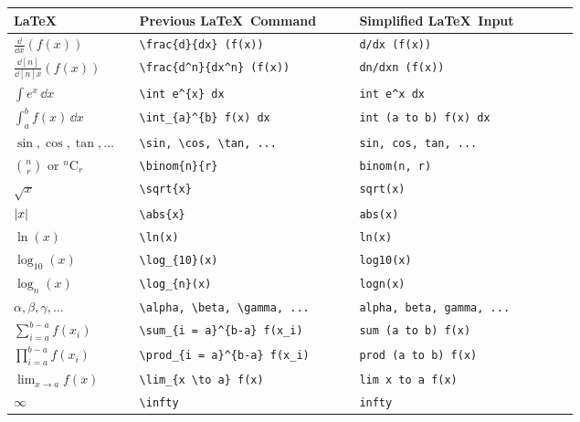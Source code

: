 \documentclass{article}
\begin{document}
\begin{longtable}[]{@{}
  >{\raggedright\arraybackslash}p{0.20\linewidth}
  >{\raggedright\arraybackslash}p{0.35\linewidth}
  >{\raggedright\arraybackslash}p{0.35\linewidth}@{}}
\toprule
\begin{minipage}[b]{\linewidth}\raggedright
\LaTeX
\end{minipage} & \begin{minipage}[b]{\linewidth}\raggedright
Previous \LaTeX \, Command
\end{minipage} & \begin{minipage}[b]{\linewidth}\raggedright
Simplified \LaTeX \, Input
\end{minipage} \\
\midrule
\endhead
\(\displaystyle\frac{\dd}{\dd x}(f(x))\) &
\texttt{\textbackslash{}frac\{d\}\{dx\}\ (f(x))} &
\texttt{d/dx\ (f(x))} \\
\(\displaystyle\frac{\dd[n]}{\dd[n]x}(f(x))\) &
\texttt{\textbackslash{}frac\{d\^{}n\}\{dx\^{}n\}\ (f(x))} &
\texttt{dn/dxn\ (f(x))} \\
\(\displaystyle\int e^{x} \, \dd x\) &
\texttt{\textbackslash{}int\ e\^{}\{x\}\ dx} &
\texttt{int\ e\^{}x\ dx} \\
\(\displaystyle\int_{a}^{b} f(x) \, \dd x\) &
\texttt{\textbackslash{}int\_\{a\}\^{}\{b\}\ f(x)\ dx} &
\texttt{int\ (a\ to\ b)\ f(x)\ dx} \\
\(\sin, \cos, \tan, \dots\) &
\texttt{\textbackslash{}sin,\ \textbackslash{}cos,\ \textbackslash{}tan,\ ...}
& \texttt{sin,\ cos,\ tan,\ ...} \\
\(\displaystyle\binom{n}{r}\) or \(^n\text{C}_r\) &
\texttt{\textbackslash{}binom\{n\}\{r\}} & \texttt{binom(n,\ r)} \\
\(\sqrt{x}\) & \texttt{\textbackslash{}sqrt\{x\}} & \texttt{sqrt(x)} \\
\(\abs{x}\) &
\texttt{\textbackslash{}abs\{x\}} &
\texttt{abs(x)} \\
\(\ln(x)\) & \texttt{\textbackslash{}ln(x)} & \texttt{ln(x)} \\
\(\log_{10}(x)\) & \texttt{\textbackslash{}log\_\{10\}(x)} &
\texttt{log10(x)} \\
\(\log_{n}(x)\) & \texttt{\textbackslash{}log\_\{n\}(x)} &
\texttt{logn(x)} \\
\(\alpha, \beta, \gamma, \dots\) &
\texttt{\textbackslash{}alpha,\ \textbackslash{}beta,\ \textbackslash{}gamma,\ ...}
& \texttt{alpha,\ beta,\ gamma,\ ...} \\
\(\displaystyle\sum_{i = a}^{b-a} f(x_i)\) &
\texttt{\textbackslash{}sum\_\{i\ =\ a\}\^{}\{b-a\}\ f(x\_i)} &
\texttt{sum\ (a\ to\ b)\ f(x)} \\
\(\displaystyle\prod_{i = a}^{b-a} f(x_i)\) &
\texttt{\textbackslash{}prod\_\{i\ =\ a\}\^{}\{b-a\}\ f(x\_i)} &
\texttt{prod\ (a\ to\ b)\ f(x)} \\
\(\displaystyle \lim_{x \to a} f(x)\) &
\texttt{\textbackslash{}lim\_\{x\ \textbackslash{}to\ a\}\ f(x)} &
\texttt{lim\ x\ to\ a\ f(x)} \\
\(\infty\) & \texttt{\textbackslash{}infty} & \texttt{infty} \\
\bottomrule
\end{longtable}
\end{document}
